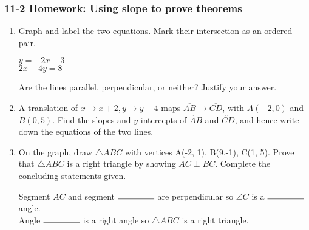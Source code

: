 \documentclass[12pt, twoside]{article}
\begin{document}
\subsubsection*{11-2 Homework: Using slope to prove theorems}
  \begin{enumerate}

\item Graph and label the two equations. Mark their intersection as an ordered pair.

  \begin{multicols}{2}
    $y = -2x+3$ \\
    $2x-4y = 8$
  \end{multicols}
  Are the lines parallel, perpendicular, or neither? Justify your answer.
  \vspace{1.5cm}

  \begin{center} %
  \end{center}


    \item A translation of $x \rightarrow x+2, y \rightarrow y-4$ maps $\overline{AB} \rightarrow \overline{CD}$, with $A(-2,0)$ and $B(0,5)$. Find the slopes and $y$-intercepts of $\overleftrightarrow{AB}$ and $\overleftrightarrow{CD}$, and hence write down the equations of the two lines.

\newpage

\item On the graph, draw $\triangle ABC$ with vertices A(-2, 1), B(9,-1), C(1, 5). Prove that $\triangle ABC$ is a right triangle by showing $\overline{AC} \perp \overline{BC}$. Complete the concluding statements given.\\[1cm]
\vspace{8cm}

Segment $\overline{AC}$ and segment $\rule{1.5cm}{0.15mm}$ are perpendicular so $\angle C$ is a $\rule{1.5cm}{0.15mm}$ angle.\\[0.5cm]
Angle $\rule{1.5cm}{0.15mm}$ is a right angle so $\triangle ABC$ is a right triangle.

  \end{enumerate}
  \newpage
  \setcounter{page}{1}
\end{document}

